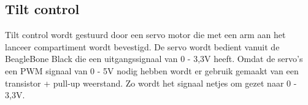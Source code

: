 \subsection{Tilt control}

Tilt control wordt gestuurd door een servo motor die met een arm aan het lanceer
compartiment wordt bevestigd. De servo wordt bedient vanuit de BeagleBone Black die een
uitgangssignaal van 0 - 3,3V heeft. Omdat de servo's een PWM signaal van 0 - 5V nodig
hebben wordt er gebruik gemaakt van een transistor + pull-up weerstand. Zo wordt het
signaal netjes om gezet naar 0 - 3,3V.
